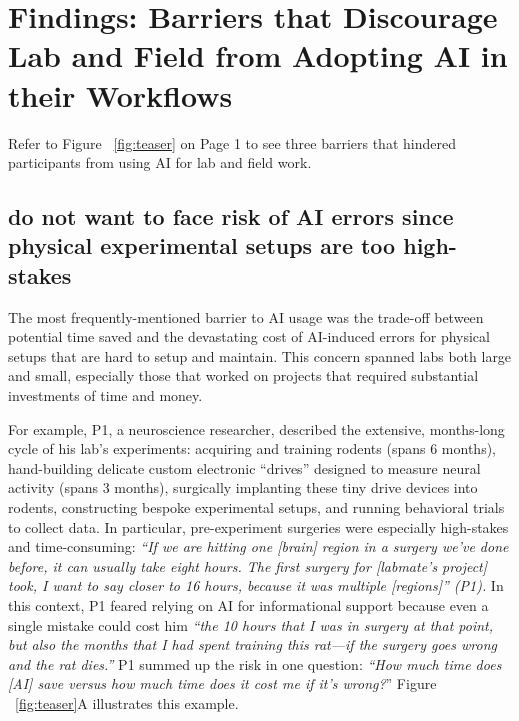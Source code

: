 
\section{Findings: Barriers that Discourage Lab and Field  from Adopting AI in their Workflows}
\label{sec:barriers}

Refer to Figure ~\ref{fig:teaser} on Page 1 to see three barriers that hindered participants from using AI for lab and field work.


\subsection{ do not want to face risk of AI errors since physical experimental setups are too high-stakes}

The most frequently-mentioned barrier to AI usage was the trade-off between potential time saved and the devastating cost of AI-induced errors for physical setups that are hard to setup and maintain. This concern spanned labs both large and small, especially those that worked on projects that required substantial investments of time and money.

For example, P1, a  neuroscience researcher, described the extensive, months-long cycle of his lab's experiments: acquiring and training rodents (spans 6 months), hand-building delicate custom electronic ``drives'' designed to measure neural activity (spans 3 months), surgically implanting these tiny drive devices into rodents, constructing bespoke experimental setups, and running behavioral trials to collect data. In particular, pre-experiment surgeries were especially high-stakes and time-consuming: \textit{``If we are hitting one [brain] region in a surgery we've done before, it can usually take eight hours. The first surgery for [labmate's project] took, I want to say closer to 16 hours, because it was multiple [regions]'' (P1).} In this context, P1 feared relying on AI for informational support because even a single mistake could cost him \textit{``the 10 hours that I was in surgery at that point, but also the months that I had spent training this rat---if the surgery goes wrong and the rat dies.''} P1 summed up the risk in one question: \textit{``How much time does [AI] save versus how much time does it cost me if it's wrong?}'' Figure ~\ref{fig:teaser}A illustrates this example.




